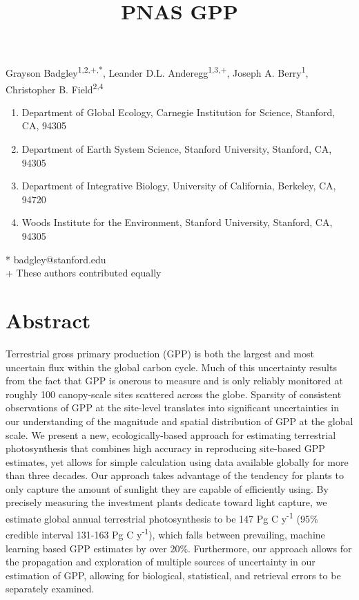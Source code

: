 \documentclass[10pt,letterpaper]{article}
\title{PNAS GPP}
\begin{document}
\vspace*{0.35in}

\begin{flushleft}
{\Large
\textbf{}
}
\newline

Grayson Badgley\textsuperscript{1,2,+,*},
Leander D.L. Anderegg\textsuperscript{1,3,+},
Joseph A. Berry\textsuperscript{1},
Christopher B. Field\textsuperscript{2,4}
\\ %

\bigskip
\small
\begin{enumerate}[itemsep=-1mm]
\item Department of Global Ecology, Carnegie Institution for Science, Stanford, CA, 94305
\item Department of Earth System Science, Stanford University, Stanford, CA, 94305
\item Department of Integrative Biology, University of California, Berkeley, CA, 94720
\item Woods Institute for the Environment, Stanford University, Stanford, CA, 94305
\end{enumerate}
\bigskip
* badgley@stanford.edu\\
+ These authors contributed equally
\end{flushleft}
\normalsize
\linenumbers
\section*{Abstract}
Terrestrial gross primary production (GPP) is both the largest and most uncertain flux within the global carbon cycle. Much of this uncertainty results from the fact that GPP is onerous to measure and is only reliably monitored at roughly 100 canopy-scale sites scattered across the globe. Sparsity of consistent observations of GPP at the site-level translates into significant uncertainties in our understanding of the magnitude and spatial distribution of GPP at the global scale. We present a new, ecologically-based approach for estimating terrestrial photosynthesis that combines high accuracy in reproducing site-based GPP estimates, yet allows for simple calculation using data available globally for more than three decades. Our approach takes advantage of the tendency for plants to only capture the amount of sunlight they are capable of efficiently using. By precisely measuring the investment plants dedicate toward light capture, we estimate global annual terrestrial photosynthesis to be 147 Pg C y\textsuperscript{-1} (95\% credible interval 131-163 Pg C y\textsuperscript{-1}), which falls between prevailing, machine learning based GPP estimates by over 20\%. Furthermore, our approach allows for the propagation and exploration of multiple sources of uncertainty in our estimation of GPP, allowing for biological, statistical, and retrieval errors to be separately examined.
\end{document}
